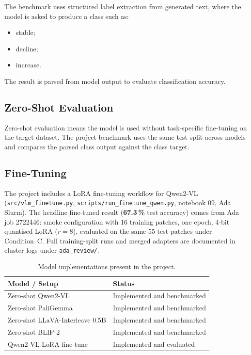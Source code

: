 \documentclass[11pt]{article}
\begin{document}
The benchmark uses structured label extraction from generated text, where the model is asked to produce a class such as:
\begin{itemize}
    \item stable;
    \item decline;
    \item increase.
\end{itemize}

The result is parsed from model output to evaluate classification accuracy.

\subsection{Zero-Shot Evaluation}
Zero-shot evaluation means the model is used without task-specific fine-tuning on the target dataset. The project benchmark uses the same test split across models and compares the parsed class output against the class target.

\subsection{Fine-Tuning}
The project includes a LoRA fine-tuning workflow for Qwen2-VL (\texttt{src/vlm\_finetune.py}, \texttt{scripts/run\_finetune\_qwen.py}, notebook 09, Ada Slurm). The headline fine-tuned result (\textbf{67.3\,\%} test accuracy) comes from Ada job 2722446: smoke configuration with 16 training patches, one epoch, 4-bit quantised LoRA ($r=8$), evaluated on the same 55 test patches under Condition~C. Full training-split runs and merged adapters are documented in cluster logs under \texttt{ada\_review/}.

\begin{table}[H]
\centering
\renewcommand{\arraystretch}{1.2}
\begin{tabular}{p{4cm} p{9cm}}
\toprule
\textbf{Model / Setup} & \textbf{Status} \\
\midrule
Zero-shot Qwen2-VL & Implemented and benchmarked \\
Zero-shot PaliGemma & Implemented and benchmarked \\
Zero-shot LLaVA-Interleave 0.5B & Implemented and benchmarked \\
Zero-shot BLIP-2 & Implemented and benchmarked \\
Qwen2-VL LoRA fine-tune & Implemented and evaluated \\
\bottomrule
\end{tabular}
\caption{Model implementations present in the project.}
\end{table}
\end{document}
